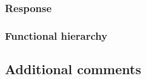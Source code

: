 
\subsubsection{Response}


\subsubsection{Functional hierarchy}


\subsection{Additional comments}

